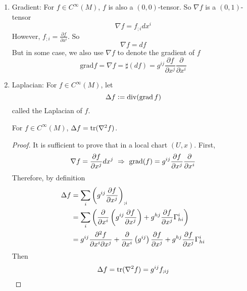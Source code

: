 \begin{enumerate}[label=\Roman{*}.]
	\item Gradient: For $f \in C^\infty(M)$, $f$ is also a $(0,0)$-tensor. So $\nabla f$ is a $(0,1)$-tensor
	\begin{equation*}
		\nabla f = f_{;i}dx^i
	\end{equation*}
	However, $f_{;i} = \frac{\partial f}{\partial x^i}$. So
	\begin{equation*}
		\nabla f = df
	\end{equation*}
	But in some case, we also use $\nabla f$ to denote the gradient of $f$
	\begin{equation*}
		\text{grad} f = \nabla f = \sharp(df) = g^{ij}\frac{\partial f}{\partial x^j}\frac{\partial}{\partial x^i}
	\end{equation*}

	\item Laplacian: For $f \in C^\infty(M)$, let
	\begin{equation*}
		\Delta f \vcentcolon= \operatorname{div}(\operatorname{grad} f)
	\end{equation*}
	called the Laplacian of $f$.
	\begin{prop}
		For $f \in C^\infty(M)$, $\Delta f = \operatorname{tr}(\nabla^2 f)$.
	\end{prop}
	\begin{proof}
		It is sufficient to prove that in a local chart $(U,x)$. First,
		\begin{equation*}
			\nabla f = \frac{\partial f}{\partial x^j}dx^j~\Rightarrow~ \operatorname{grad}(f) = g^{ij}\frac{\partial f}{\partial x^j}\frac{\partial}{\partial x^i}
		\end{equation*}
		Therefore, by definition
		\begin{equation*}
			\begin{aligned}
				\Delta f &= \sum_i \left(g^{ij}\frac{\partial f}{\partial x^j}\right)_{;i} \\
				&= \sum_i \left(\frac{\partial}{\partial x^i} \left(g^{ij}\frac{\partial f}{\partial x^j}\right) + g^{hj}\frac{\partial f}{\partial x^j}\Gamma^i_{hi}\right) \\
				&= g^{ij}\frac{\partial^2 f}{\partial x^i\partial x^j} +\frac{\partial}{\partial x^i} \left(g^{ij}\right)\frac{\partial f}{\partial x^j} +g^{hj}\frac{\partial f}{\partial x^j}\Gamma^i_{hi}
			\end{aligned}
		\end{equation*}
		Then 
		\begin{equation*}
			\begin{aligned}
				\Delta f &= \op{tr}(\nabla^2 f) = g^{ij}f_{;ij} \\

\end{aligned}
\end{equation*}
\end{proof}
\end{enumerate}
